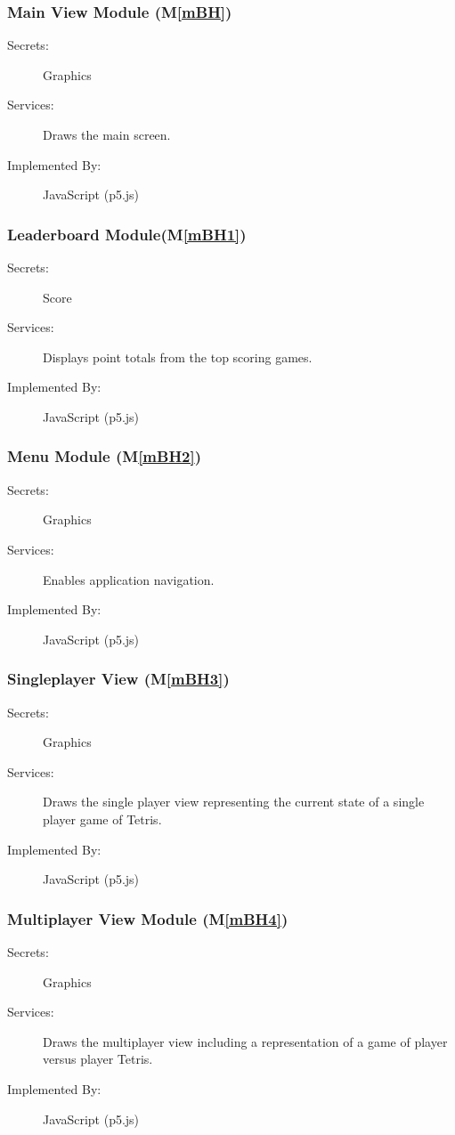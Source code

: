 \documentclass[12pt, titlepage]{article}
\newcommand{\mref}[1]{M\ref{#1}}
\begin{document}
\subsubsection{Main View Module (\mref{mBH})}
\begin{description}
\item[Secrets:]Graphics
\item[Services:]Draws the main screen.
\item[Implemented By:] JavaScript (p5.js)
\end{description}

\subsubsection{Leaderboard Module(\mref{mBH1})}
\begin{description}
\item[Secrets:] Score
\item[Services:] Displays point totals from the top scoring games.
\item[Implemented By:] JavaScript (p5.js)
\end{description}

\subsubsection{Menu Module (\mref{mBH2})}
\begin{description}
\item[Secrets:]Graphics
\item[Services:] Enables application navigation.
\item[Implemented By:] JavaScript (p5.js)
\end{description}

\subsubsection{Singleplayer View (\mref{mBH3})}
\begin{description}
\item[Secrets:]Graphics
\item[Services:]Draws the single player view representing the current state of a single player game of Tetris.
\item[Implemented By:] JavaScript (p5.js)
\end{description}

\subsubsection{Multiplayer View Module (\mref{mBH4})}
\begin{description}
\item[Secrets:]Graphics
\item[Services:]Draws the multiplayer view including a representation of a game of player versus player Tetris.
\item[Implemented By:] JavaScript (p5.js)
\end{description}
\end{document}
